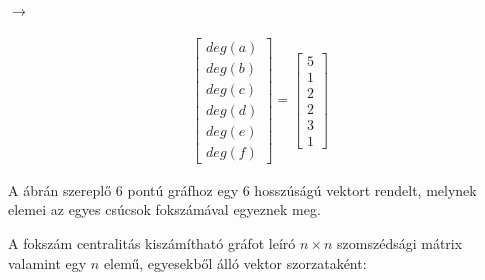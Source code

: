 \documentclass[12pt,numbers=noenddot]{report}
\begin{document}
\noindent
\begin{minipage}[c]{0.4\linewidth}


\end{minipage}
\noindent
\begin{minipage}[c]{0.2\linewidth}

\hspace{0.5cm}
$\rightarrow$

\end{minipage}
\begin{minipage}[c]{0.2\linewidth}

\begin{align}
	\begin{bmatrix}
		deg(a)\\
		deg(b)\\
		deg(c)\\
		deg(d)\\
		deg(e)\\
		deg(f)
	\end{bmatrix}
	=
	\begin{bmatrix}
		5\\
		1\\
		2\\
		2\\
		3\\
		1
	\end{bmatrix}
\end{align}

\end{minipage}

\vspace{0.5cm}

A ábrán szereplő 6 pontú gráfhoz egy 6 hosszúságú vektort rendelt, 
melynek elemei az egyes csúcsok fokszámával egyeznek meg.

A fokszám centralitás kiszámítható gráfot leíró $n \times n$ szomszédsági 
mátrix valamint egy $n$ elemű, egyesekből álló vektor szorzataként:
\end{document}
